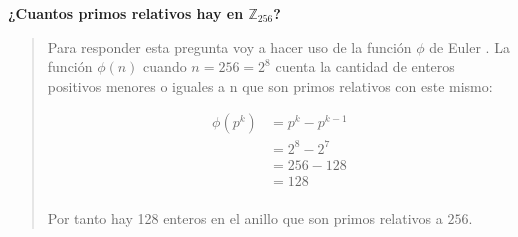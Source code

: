 \textbf{¿Cuantos primos relativos hay en $\mathbb{Z}_{256}$?} \vspace{.3cm}

\begin{quote}
     Para responder esta pregunta voy a hacer uso de la
     función $\phi$ de Euler \citep{wikipedia_euler_totient_es}. La función $\phi (n) $ cuando
     $n=256=2^8$ cuenta la cantidad de enteros positivos menores o iguales a n que son
     primos relativos con este mismo:

     \begin{align*}
         \phi(p^k) &= p^k - p^{k-1} \\
         &= 2^8 - 2^7 \\
         &= 256 - 128 \\
         &= 128 \\
     \end{align*}

     Por tanto hay 128 enteros en el anillo que son primos relativos a $256$.
\end{quote}
\vspace{.5cm}
